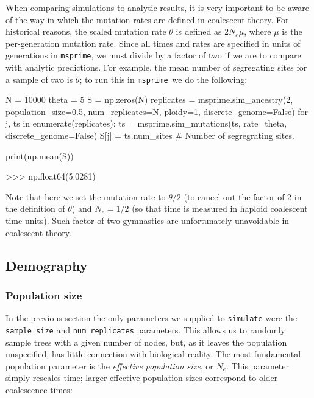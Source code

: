 \documentclass[graybox]{svmult}
\newcommand{\msprime}[0]{\texttt{msprime}}
\begin{document}
When comparing simulations to analytic results, it is very important to be aware of the way in which the
mutation rates are defined in coalescent theory. For historical reasons,
the scaled mutation rate \(\theta\) is defined as \(2N_e \mu\), where
\(\mu\) is the per-generation mutation rate. Since all times and rates
are specified in units of generations in \msprime, we must divide by a
factor of two if we are to compare with analytic predictions. For
example, the mean number of segregating sites for a sample of two is
\(\theta\); to run this in \msprime\ we do the following:

\begin{pythoncode}
N = 10000
theta = 5
S = np.zeros(N)
replicates = msprime.sim_ancestry(2, population_size=0.5, num_replicates=N, ploidy=1, discrete_genome=False)
for j, ts in enumerate(replicates):
    ts = msprime.sim_mutations(ts, rate=theta, discrete_genome=False)
    S[j] = ts.num_sites  # Number of segregrating sites.

print(np.mean(S))

>>> np.float64(5.0281)

\end{pythoncode}

    Note that here we set the mutation rate to \(\theta / 2\) (to cancel out
the factor of 2 in the definition of \(\theta\)) and \(N_e = 1/2\) (so
that time is measured in haploid coalescent time units). Such
factor-of-two gymnastics are unfortunately unavoidable in coalescent
theory.

\subsection{Demography}\label{Demography}

\subsubsection{Population size}\label{population-models}

In the previous section the only parameters we supplied to
\texttt{simulate} were the \texttt{sample\_size} and
\texttt{num\_replicates} parameters. This allows us to randomly sample
trees with a given number of nodes, but, as it leaves the population
unspecified, has little connection with
biological reality. The most fundamental population parameter is the \emph{effective population size}, or
\(N_e\). This parameter simply rescales time; larger effective
population sizes correspond to older coalescence times:
\end{document}
